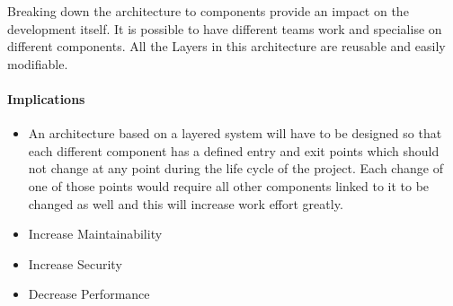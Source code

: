 	Breaking down the architecture to components provide an impact on the development itself. It is possible to have different teams work and specialise on different components. All the Layers in this architecture are reusable and easily modifiable. 


\paragraph{Implications}
\begin{itemize}
	\item 
	An architecture based on a layered system will have to be designed so that each different component has a defined entry and exit points which should not change at any point during the life cycle of the project. Each change of one of those points would require all other components linked to it to be changed as well and this will increase work effort greatly.

	\item Increase Maintainability
	\item Increase Security
	\item Decrease Performance
\end{itemize}
